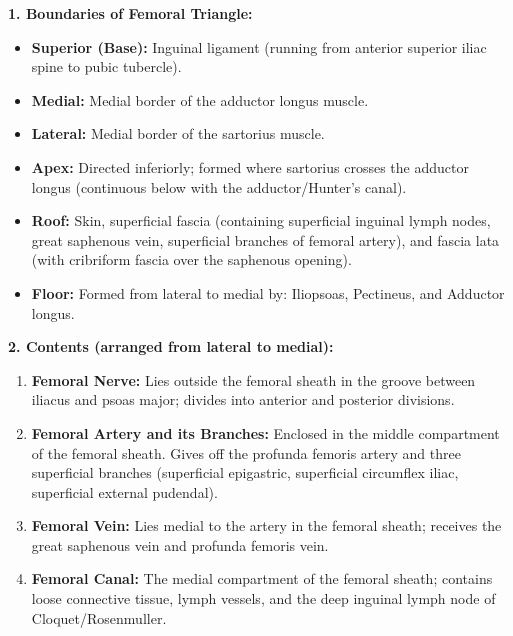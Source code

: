 \documentclass[11pt,a4paper]{article}
\begin{document}
\begin{ansbox}
\textbf{1. Boundaries of Femoral Triangle:}
\begin{itemize}[leftmargin=*]
    \item \textbf{Superior (Base):} Inguinal ligament (running from anterior superior iliac spine to pubic tubercle).
    \item \textbf{Medial:} Medial border of the adductor longus muscle.
    \item \textbf{Lateral:} Medial border of the sartorius muscle.
    \item \textbf{Apex:} Directed inferiorly; formed where sartorius crosses the adductor longus (continuous below with the adductor/Hunter's canal).
    \item \textbf{Roof:} Skin, superficial fascia (containing superficial inguinal lymph nodes, great saphenous vein, superficial branches of femoral artery), and fascia lata (with cribriform fascia over the saphenous opening).
    \item \textbf{Floor:} Formed from lateral to medial by: Iliopsoas, Pectineus, and Adductor longus.
\end{itemize}

\textbf{2. Contents (arranged from lateral to medial):}
\begin{enumerate}[leftmargin=*]
    \item \textbf{Femoral Nerve:} Lies outside the femoral sheath in the groove between iliacus and psoas major; divides into anterior and posterior divisions.
    \item \textbf{Femoral Artery and its Branches:} Enclosed in the middle compartment of the femoral sheath. Gives off the profunda femoris artery and three superficial branches (superficial epigastric, superficial circumflex iliac, superficial external pudendal).
    \item \textbf{Femoral Vein:} Lies medial to the artery in the femoral sheath; receives the great saphenous vein and profunda femoris vein.
    \item \textbf{Femoral Canal:} The medial compartment of the femoral sheath; contains loose connective tissue, lymph vessels, and the deep inguinal lymph node of Cloquet/Rosenmuller.
\end{enumerate}


\end{ansbox}
\end{document}
